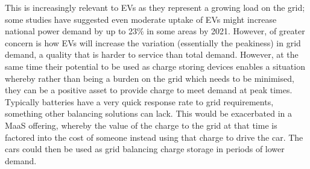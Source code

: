 \documentclass[journal]{IEEEtran}
\begin{document}
This is increasingly relevant to EVs as they represent a growing load
on the grid; some studies have suggested even moderate uptake of EVs
might increase national power demand by up to 23\% in some areas by
2021. However, of greater concern is how EVs will increase the
variation (essentially the peakiness) in grid demand, a quality that
is harder to service than total demand. However, at the same time
their potential to be used as charge storing devices enables a
situation whereby rather than being a burden on the grid which needs
to be minimised, they can be a positive asset to provide charge to
meet demand at peak times. Typically batteries have a very quick
response rate to grid requirements, something other balancing
solutions can lack. This would be exacerbated in a MaaS offering,
whereby the value of the charge to the grid at that time is factored
into the cost of someone instead using that charge to drive the
car. The cars could then be used as grid balancing charge storage in
periods of lower demand.






\end{document}
